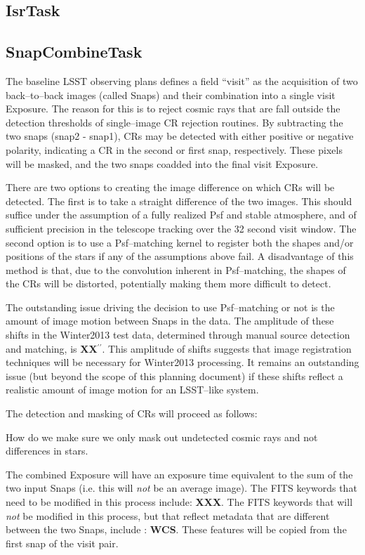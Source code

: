 \documentclass[12pt]{article}
\def\arcsec{^{\prime\prime}}
\begin{document}
\subsection{IsrTask}
\subsection{SnapCombineTask}

The baseline LSST observing plans defines a field ``visit'' as the
acquisition of two back--to--back images (called Snaps) and their
combination into a single visit Exposure.  The reason for this is to
reject cosmic rays that are fall outside the detection thresholds of
single--image CR rejection routines.  By subtracting the two snaps
(snap2 - snap1), CRs may be detected with either positive or negative
polarity, indicating a CR in the second or first snap, respectively.
These pixels will be masked, and the two snaps coadded into the final
visit Exposure.

There are two options to creating the image difference on which CRs
will be detected.  The first is to take a straight difference of the
two images.  This should suffice under the assumption of a fully
realized Psf and stable atmosphere, and of sufficient precision in the
telescope tracking over the 32 second visit window.  The second option
is to use a Psf--matching kernel to register both the shapes and/or
positions of the stars if any of the assumptions above fail.  A
disadvantage of this method is that, due to the convolution inherent
in Psf--matching, the shapes of the CRs will be distorted, potentially
making them more difficult to detect.

The outstanding issue driving the decision to use Psf--matching or not
is the amount of image motion between Snaps in the data.  The
amplitude of these shifts in the Winter2013 test data, determined
through manual source detection and matching, is {\bf XX}$\arcsec$.
This amplitude of shifts suggests that image registration techniques
will be necessary for Winter2013 processing.  It remains an
outstanding issue (but beyond the scope of this planning document) if
these shifts reflect a realistic amount of image motion for an
LSST--like system.

The detection and masking of CRs will proceed as follows:

How do we make sure we only mask out undetected cosmic rays and not
differences in stars.  

The combined Exposure will have an exposure time equivalent to the sum
of the two input Snaps (i.e. this will {\it not} be an average image).
The FITS keywords that need to be modified in this process include:
{\bf XXX}.  The FITS keywords that will {\it not} be modified in this
process, but that reflect metadata that are different between the two
Snaps, include : {\bf WCS}.  These features will be copied from the
first snap of the visit pair.
\end{document}
